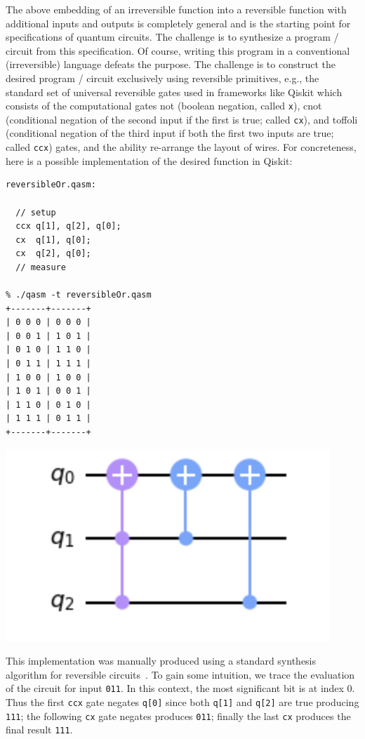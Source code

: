 The above embedding of an irreversible function into a reversible function with additional inputs and outputs is completely general and is the starting point for specifications of quantum circuits. The challenge is to synthesize a program / circuit from this specification. Of course, writing this program in a conventional (irreversible) language defeats the purpose. The challenge is to construct the desired program / circuit exclusively using reversible primitives, e.g., the standard set of universal reversible gates used in frameworks like Qiskit which consists of the computational gates \textsf{not} (boolean negation, called \verb|x|), \textsf{cnot} (conditional negation of the second input if the first is true; called \verb|cx|), and \textsf{toffoli} (conditional negation of the third input if both the first two inputs are true; called \verb|ccx|) gates, and the ability re-arrange the layout of wires. For concreteness, here is a possible implementation of the desired function in Qiskit:

\begin{center}
  \begin{minipage}[c]{0.4\linewidth}
\begin{verbatim}
reversibleOr.qasm:

  // setup
  ccx q[1], q[2], q[0];
  cx  q[1], q[0];
  cx  q[2], q[0];
  // measure

% ./qasm -t reversibleOr.qasm
+-------+-------+
| 0 0 0 | 0 0 0 |
| 0 0 1 | 1 0 1 |
| 0 1 0 | 1 1 0 |
| 0 1 1 | 1 1 1 |
| 1 0 0 | 1 0 0 |
| 1 0 1 | 0 0 1 |
| 1 1 0 | 0 1 0 |
| 1 1 1 | 0 1 1 |
+-------+-------+
  \end{verbatim}
  \end{minipage}
  \qquad
  \includegraphics[scale=0.7]{reversibleOr.png}
\end{center}

\noindent This implementation was manually produced using a standard synthesis algorithm for reversible
circuits~\cite{10.1145/775832.775915}. To gain some intuition, we trace the evaluation of the circuit for input
\verb|011|. In this context, the most significant bit is at index 0. Thus the first \verb|ccx| gate negates \verb|q[0]|
since both \verb|q[1]| and \verb|q[2]| are true producing \verb|111|; the following \verb|cx| gate negates produces \verb|011|; finally the last \verb|cx| produces the final result \verb|111|.

